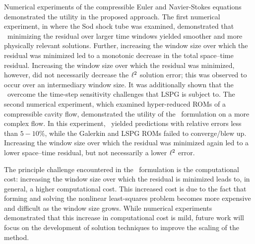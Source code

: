 \documentclass[3p,computermodern,10pt]{elsarticle}
\begin{document}
Numerical experiments of the compressible Euler and Navier-Stokes equations demonstrated the utility in the proposed approach. The first numerical experiment, in where the Sod shock tube was examined, demonstrated that \methodAcronymROMs\ minimizing the residual over larger time windows yielded smoother and more physically relevant solutions. Further, increasing the window size over which the residual was minimized led to a monotonic decrease in the total space--time residual. Increasing the window size over which the residual was minimized, however, did not necessarily decrease the $\ell^2$ solution error; this was observed to occur over an intermediary window size. It was 
additionally shown that the \methodAcronymROMs\ overcome the time-step sensitivity challenges that LSPG is subject to. The second numerical experiment, which examined hyper-reduced ROMs of a compressible cavity flow, demonstrated the utility of the \methodAcronym\ formulation on a more complex flow. In this experiment, \methodAcronymROMs\ yielded predictions with relative errors less than $5-10\%$, while the Galerkin and LSPG ROMs failed to converge/blew up. Increasing the window size over which the residual was minimized again led to a lower space--time residual, but not necessarily a lower $\ell^2$ error.

 
The principle challenge encountered in the \methodAcronym\ formulation is the computational cost: increasing the window size over which the residual is minimized leads to, in general, a higher computational cost. This increased cost is due to the fact that forming and solving the nonlinear least-squares problem becomes more expensive and difficult as the window size grows. While numerical experiments demonstrated that this increase in computational cost is mild, future work will focus on the development of solution techniques to improve the scaling of the method.

 
\end{document}
